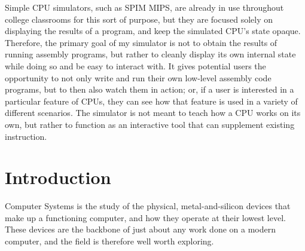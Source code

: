 \documentclass[12pt,twoside]{reedthesis}
\begin{document}
Simple CPU simulators, such as SPIM MIPS, are already in use throughout college classrooms for this sort of purpose, but they are focused solely on displaying the results of a program, and keep the simulated CPU's state opaque.
Therefore, the primary goal of my simulator is not to obtain the results of running assembly programs, but rather to cleanly display its own internal state while doing so and be easy to interact with.
It gives potential users the opportunity to not only write and run their own low-level assembly code programs, but to then also watch them in action; or, if a user is interested in a particular feature of CPUs, they can see how that feature is used in a variety of different scenarios. The simulator is not meant to teach how a CPU works on its own, but rather to function as an interactive tool that can supplement existing instruction.


\mainmatter %
\pagestyle{fancyplain} %


\chapter*{Introduction}


Computer Systems is the study of the physical, metal-and-silicon devices that make up a functioning computer, and how they operate at their lowest level. These devices are the backbone of just about any work done on a modern computer, and the field is therefore well worth exploring.
\end{document}
